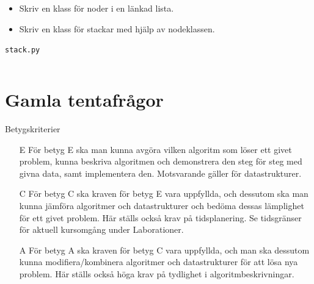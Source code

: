 \begin{frame}
  \begin{exercise}
    \begin{itemize}
      \item Skriv en klass för noder i en länkad lista.
      \item Skriv en klass för stackar med hjälp av nodeklassen.
    \end{itemize}
  \end{exercise}
\end{frame}

\begin{frame}[fragile]
  \texttt{stack.py}\hrulefill
  \inputminted{python}{src/stack.py}
\end{frame}


\section{Gamla tentafrågor}

\begin{frame}
  \begin{block}{Betygskriterier}
    \begin{itemize}
      \item[E]
        För betyg E ska man kunna avgöra vilken algoritm som löser ett givet 
        problem, kunna beskriva algoritmen och demonstrera den steg för steg 
        med givna data, samt implementera den. Motsvarande gäller för 
        datastrukturer.

        \pause

      \item[C]
        För betyg C ska kraven för betyg E vara uppfyllda, och dessutom ska man 
        kunna jämföra algoritmer och datastrukturer och bedöma dessas 
        lämplighet för ett givet problem. Här ställs också krav på 
        tidsplanering. Se tidsgränser för aktuell kursomgång under 
        Laborationer.

        \pause

      \item[A]
        För betyg A ska kraven för betyg C vara uppfyllda, och man ska dessutom 
        kunna modifiera/kombinera algoritmer och datastrukturer för att lösa 
        nya problem. Här ställs också höga krav på tydlighet i 
        algoritmbeskrivningar.
    \end{itemize}
  \end{block}
\end{frame}

